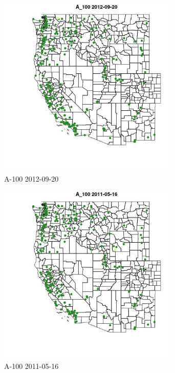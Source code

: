 \begin{figure} 
\centering  
\includegraphics[width=0.77\textwidth]{Code_Outputs/ML_input_report_ML_input_PM25_Step5_part_d_de_duplicated_aves_ML_input_MapObsA_1002012-09-20.jpg} 
\caption{\label{fig:ML_input_report_ML_input_PM25_Step5_part_d_de_duplicated_aves_ML_inputMapObsA_1002012-09-20}A-100 2012-09-20} 
\end{figure} 
 

\begin{figure} 
\centering  
\includegraphics[width=0.77\textwidth]{Code_Outputs/ML_input_report_ML_input_PM25_Step5_part_d_de_duplicated_aves_ML_input_MapObsA_1002011-05-16.jpg} 
\caption{\label{fig:ML_input_report_ML_input_PM25_Step5_part_d_de_duplicated_aves_ML_inputMapObsA_1002011-05-16}A-100 2011-05-16} 
\end{figure} 
 

